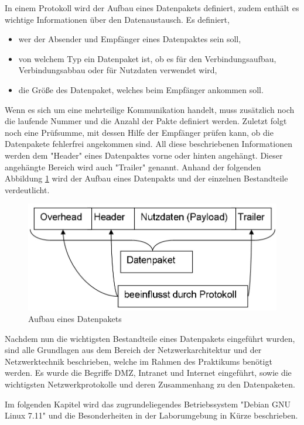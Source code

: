 \documentclass[
a4paper,     %
 headsepline, %
footsepline, %
titlepage,   %
 halfparskip,     %
 fleqn,       %
12pt         %
]{scrartcl}  %
\begin{document}
In einem Protokoll wird der Aufbau eines Datenpakets definiert, zudem enthält es wichtige Informationen über den Datenaustausch. 
Es definiert, 
\begin{itemize}
\item wer der Absender und Empfänger eines Datenpaktes sein soll,
\item von welchem Typ ein Datenpaket ist, ob es für den Verbindungsaufbau, Verbindungsabbau oder für Nutzdaten verwendet wird, 
\item die Größe des Datenpaket, welches beim Empfänger ankommen soll. 
\end{itemize}
Wenn es sich um eine mehrteilige Kommunikation handelt, muss zusätzlich noch die laufende Nummer und die Anzahl der Pakte definiert werden. Zuletzt folgt noch eine Prüfsumme, mit dessen Hilfe der Empfänger prüfen kann, ob die Datenpakete fehlerfrei angekommen sind. 
All diese beschriebenen Informationen werden dem "Header" eines Datenpaktes vorne oder hinten angehängt. Dieser angehängte Bereich wird auch "Trailer" genannt. Anhand der folgenden Abbildung \ref{fig:datenpaket} wird der Aufbau eines Datenpakts und der einzelnen Bestandteile verdeutlicht. 
\begin{figure}[!h]
	\includegraphics[width=\textwidth]{pictures/datenpaket.png}
	\caption{Aufbau eines Datenpakets \cite{Header-Dat}}
	\label{fig:datenpaket}
\end{figure}

Nachdem nun die wichtigsten Bestandteile eines Datenpakets eingeführt wurden, sind alle Grundlagen aus dem Bereich der Netzwerkarchitektur und der Netzwerktechnik beschrieben, welche im Rahmen des Praktikums benötigt werden. Es wurde die Begriffe DMZ, Intranet und Internet eingeführt, sowie die wichtigsten Netzwerkprotokolle und deren Zusammenhang zu den Datenpaketen. 

Im folgenden Kapitel wird das zugrundeliegendes Betriebssystem "Debian GNU Linux 7.11" und die Besonderheiten in der Laborumgebung in Kürze beschrieben.
\end{document}
